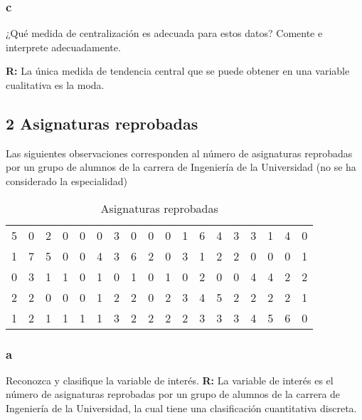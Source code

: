 \documentclass{templateNote}
\begin{document}
\subsubsection{c}
\indent
¿Qué medida de centralización es adecuada para estos datos? Comente e interprete adecuadamente.

\textbf{R:} La única medida de tendencia central que se puede obtener en una variable cualitativa
es la moda.

\newpage
\begin{samepage}
    
    \subsection{2 Asignaturas reprobadas}
    \indent
    Las siguientes observaciones corresponden al número de asignaturas reprobadas por un
    grupo de alumnos de la carrera de Ingeniería de la Universidad (no se ha considerado la
    especialidad)
    \begin{table}[H]
        \begin{center}
            \begin{tabular}{| c | c | c | c | c | c | c | c | c | c | c | c | c | c | c | c | c | c |}
                \hline
                5 & 0 & 2 & 0 & 0 & 0 & 3 & 0 & 0 & 0 & 1 & 6 & 4 & 3 & 3 & 1 & 4 & 0 \\
                1 & 7 & 5 & 0 & 0 & 4 & 3 & 6 & 2 & 0 & 3 & 1 & 2 & 2 & 0 & 0 & 0 & 1 \\
                0 & 3 & 1 & 1 & 0 & 1 & 0 & 1 & 0 & 1 & 0 & 2 & 0 & 0 & 4 & 4 & 2 & 2 \\
                2 & 2 & 0 & 0 & 0 & 1 & 2 & 2 & 0 & 2 & 3 & 4 & 5 & 2 & 2 & 2 & 2 & 1 \\
                1 & 2 & 1 & 1 & 1 & 1 & 3 & 2 & 2 & 2 & 2 & 3 & 3 & 3 & 4 & 5 & 6 & 0 \\
                \hline
            \end{tabular}
            \caption{Asignaturas reprobadas}
        \end{center}
    \end{table}
    \subsubsection{a}
    \indent
    Reconozca y clasifique la variable de interés.
    \textbf{R:} La variable de interés es el número de asignaturas reprobadas por un grupo de alumnos de la carrera de Ingeniería de la Universidad, la cual tiene una clasificación cuantitativa discreta.
    

\end{samepage}
\end{document}
